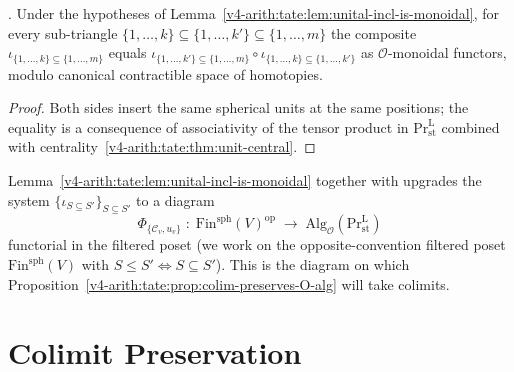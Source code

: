 \begin{corollary}
\label{v4-arith:tate:cor:iota-restriction}
\ClaimStatusProvedHere. Under the hypotheses of
Lemma~\ref{v4-arith:tate:lem:unital-incl-is-monoidal}, for every
sub-triangle \(\{1,\ldots,k\}\subseteq\{1,\ldots,k'\}\subseteq\{1,\ldots,m\}\)
the composite \(\iota_{\{1,\ldots,k\}\subseteq\{1,\ldots,m\}}\) equals
\(\iota_{\{1,\ldots,k'\}\subseteq\{1,\ldots,m\}}\circ\iota_{\{1,\ldots,k\}\subseteq\{1,\ldots,k'\}}\)
as \(\mathcal{O}\)-monoidal functors, modulo canonical contractible
space of homotopies.
\end{corollary}

\begin{proof}
Both sides insert the same spherical units at the same positions;
the equality is a consequence of associativity of the tensor product
in \(\mathrm{Pr}^{\mathrm{L}}_{\mathrm{st}}\) combined with
centrality~\ref{v4-arith:tate:thm:unit-central}.
\end{proof}

\begin{remark}
\label{v4-arith:tate:rem:iota-2cells}
Lemma~\ref{v4-arith:tate:lem:unital-incl-is-monoidal} together with
 upgrades the system
\(\{\iota_{S\subseteq S'}\}_{S\subseteq S'}\) to a diagram
\[
\Phi_{\{\mathcal{C}_{v},u_{v}\}}\;:\;\mathrm{Fin}^{\mathrm{sph}}(V)^{\mathrm{op}}\;\longrightarrow\;\mathrm{Alg}_{\mathcal{O}}(\mathrm{Pr}^{\mathrm{L}}_{\mathrm{st}})
\]
functorial in the filtered poset (we work on the opposite-convention
filtered poset \(\mathrm{Fin}^{\mathrm{sph}}(V)\) with \(S\leq S'\Leftrightarrow S\subseteq S'\)).
This is the diagram on which
Proposition~\ref{v4-arith:tate:prop:colim-preserves-O-alg} will
take colimits.
\end{remark}

\section{Colimit Preservation}
\label{v4-arith:tate:colim-preservation}

